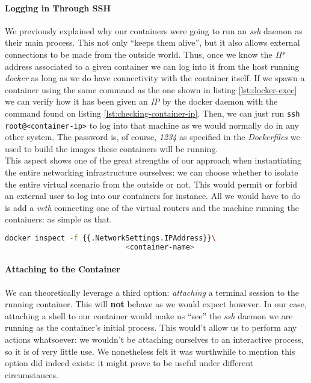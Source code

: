                 \paragraph{Logging in Through SSH}
                    We previously explained why our containers were going to run an \textit{ssh} daemon as their main process. This not only ``keeps them alive'', but it also allows external connections to be made from the outside world. Thus, once we know the \textit{IP} address associated to a given container we can log into it from the host running \textit{docker} as long as we do have connectivity with the container itself. If we spawn a container using the same command as the one shown in listing \ref{lst:docker-exec} we can verify how it has been given an \textit{IP} by the docker daemon with the command found on listing \ref{lst:checking-container-ip}. Then, we can just run \texttt{ssh root@<container-ip>} to log into that machine as we would normally do in any other system. The password is, of course, \textit{1234} as specified in the \textit{Dockerfiles} we used to build the images these containers will be running.\\

                    This aspect shows one of the great strengths of our approach when instantiating the entire networking infrastructure ourselves: we can choose whether to isolate the entire virtual scenario from the outside or not. This would permit or forbid an external user to log into our containers for instance. All we would have to do is add a \textit{veth} connecting one of the virtual routers and the machine running the containers: as simple as that.\\

                    \begin{lstlisting}[language = bash, caption = Checking a Container's \textit{IP} Address., label = lst:checking-container-ip]
                        docker inspect -f {{.NetworkSettings.IPAddress}}\
                            <container-name>
                    \end{lstlisting}

                \paragraph{Attaching to the Container}
                    We can theoretically leverage a third option: \textit{attaching} a terminal session to the running container. This will \textbf{not} behave as we would expect however. In our case, attaching a shell to our container would make us ``see'' the \textit{ssh} daemon we are running as the container's initial process. This would't allow us to perform any actions whatsoever: we wouldn't be attaching ourselves to an interactive process, so it is of very little use. We nonetheless felt it was worthwhile to mention this option did indeed exists: it might prove to be useful under different circumstances.\\

